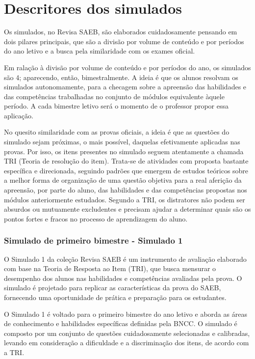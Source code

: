 \section{Descritores dos simulados}

Os simulados, no Revisa SAEB, são elaborados cuidadosamente pensando em
dois pilares principais, que são a divisão por volume de conteúdo e por
períodos do ano letivo e a busca pela similaridade com os exames
oficial.

Em ralação à divisão por volume de conteúdo e por períodos do ano, os
simulados são 4; aparecendo, então, bimestralmente. A ideia é que os
alunos resolvam os simulados autonomamente, para a checagem sobre a
apreensão das habilidades e das competências trabalhadas no conjunto de
módulos equivalente àquele período. A cada bimestre letivo será o
momento de o professor propor essa aplicação.

No quesito similaridade com as provas oficiais, a ideia é que as
questões do simulado sejam próximas, o mais possível, daquelas
efetivamente aplicadas nas provas. Por isso, os itens presentes no
simulado seguem atentamente a chamada TRI (Teoria de resolução do item).
Trata-se de atividades com proposta bastante específica e direcionada,
seguindo padrões que emergem de estudos teóricos sobre a melhor forma de
organização de uma questão objetiva para a real aferição da apreensão,
por parte do aluno, das habilidades e das competências propostas nos
módulos anteriormente estudados. Segundo a TRI, os distratores não podem
ser absurdos ou mutuamente excludentes e precisam ajudar a determinar
quais são os pontos fortes e fracos no processo de aprendizagem do
aluno.

\subsubsection{Simulado de primeiro bimestre - Simulado
1}\label{simulado-de-primeiro-bimestre---simulado-1}

O Simulado 1 da coleção Revisa SAEB é um instrumento de avaliação elaborado com base na
Teoria de Resposta ao Item (TRI), que busca mensurar o desempenho dos
alunos nas habilidades e competências avaliadas pela prova. O simulado é
projetado para replicar as características da prova do SAEB, fornecendo
uma oportunidade de prática e preparação para os estudantes.

O Simulado 1 é voltado para o primeiro bimestre do ano letivo e aborda
as áreas de conhecimento e habilidades específicas definidas pela BNCC.
O simulado é composto por um conjunto de questões cuidadosamente
selecionadas e calibradas, levando em consideração a dificuldade e a
discriminação dos itens, de acordo com a TRI.

